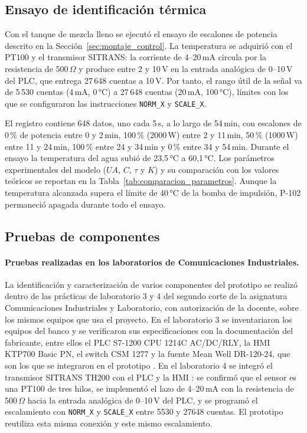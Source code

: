\subsection{Ensayo de identificación térmica}

Con el tanque de mezcla lleno se ejecutó el ensayo de escalones de potencia descrito en la Sección~\ref{sec:montaje_control}. La temperatura se adquirió con el PT100 y el transmisor SITRANS: la corriente de 4--20\,mA circula por la resistencia de 500\,$\Omega$ y produce entre 2 y 10\,V en la entrada analógica de 0--10\,V del PLC, que entrega 27\,648 cuentas a 10\,V. Por tanto, el rango útil de la señal va de 5\,530 cuentas (4\,mA, 0\,°C) a 27\,648 cuentas (20\,mA, 100\,°C), límites con los que se configuraron las instrucciones \texttt{NORM\_X} y \texttt{SCALE\_X}.

El registro contiene 648 datos, uno cada 5\,s, a lo largo de 54\,min, con escalones de 0\,\% de potencia entre 0 y 2\,min, 100\,\% (2000\,W) entre 2 y 11\,min, 50\,\% (1000\,W) entre 11 y 24\,min, 100\,\% entre 24 y 34\,min y 0\,\% entre 34 y 54\,min. Durante el ensayo la temperatura del agua subió de 23,5\,°C a 60,1\,°C. Los parámetros experimentales del modelo ($UA$, $C$, $\tau$ y $K$) y su comparación con los valores teóricos se reportan en la Tabla~\ref{tab:comparacion_parametros}. Aunque la temperatura alcanzada supera el límite de 40\,°C de la bomba de impulsión, P-102 permaneció apagada durante todo el ensayo.

\subsection{Pruebas de componentes}

\paragraph{Pruebas realizadas en los laboratorios de Comunicaciones Industriales.} La identificación y caracterización de varios componentes del prototipo se realizó dentro de las prácticas de laboratorio 3 y 4 del segundo corte de la asignatura Comunicaciones Industriales y Laboratorio, con autorización de la docente, sobre los mismos equipos que usa el proyecto. En el laboratorio 3 se inventariaron los equipos del banco y se verificaron sus especificaciones con la documentación del fabricante, entre ellos el PLC S7-1200 CPU 1214C AC/DC/RLY, la HMI KTP700 Basic PN, el switch CSM 1277 y la fuente Mean Well DR-120-24, que son los que se integraron en el prototipo \cite{ruiz2026lab3}. En el laboratorio 4 se integró el transmisor SITRANS TH200 con el PLC y la HMI \cite{ruiz2026lab4}: se confirmó que el sensor es una PT100 de tres hilos, se implementó el lazo de 4--20\,mA con la resistencia de 500\,$\Omega$ hacia la entrada analógica de 0--10\,V del PLC, y se programó el escalamiento con \texttt{NORM\_X} y \texttt{SCALE\_X} entre 5530 y 27648 cuentas. El prototipo reutiliza esta misma conexión y este mismo escalamiento.

